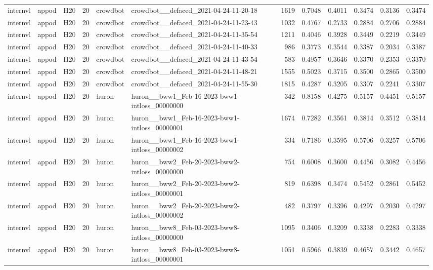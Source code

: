 \begin{table}[tbp]
\begin{tabular}{lllrllrrrrrr}
internvl & appod & H20 & 20 & crowdbot & crowdbot\_\_defaced\_2021-04-24-11-20-18 & 1619 & 0.7048 & 0.4011 & 0.3474 & 0.3136 & 0.3474 \\
internvl & appod & H20 & 20 & crowdbot & crowdbot\_\_defaced\_2021-04-24-11-23-43 & 1032 & 0.4767 & 0.2733 & 0.2884 & 0.2706 & 0.2884 \\
internvl & appod & H20 & 20 & crowdbot & crowdbot\_\_defaced\_2021-04-24-11-35-54 & 1211 & 0.4046 & 0.3928 & 0.3449 & 0.2219 & 0.3449 \\
internvl & appod & H20 & 20 & crowdbot & crowdbot\_\_defaced\_2021-04-24-11-40-33 & 986 & 0.3773 & 0.3544 & 0.3387 & 0.2034 & 0.3387 \\
internvl & appod & H20 & 20 & crowdbot & crowdbot\_\_defaced\_2021-04-24-11-43-54 & 583 & 0.4957 & 0.3646 & 0.3370 & 0.2353 & 0.3370 \\
internvl & appod & H20 & 20 & crowdbot & crowdbot\_\_defaced\_2021-04-24-11-48-21 & 1555 & 0.5023 & 0.3715 & 0.3500 & 0.2865 & 0.3500 \\
internvl & appod & H20 & 20 & crowdbot & crowdbot\_\_defaced\_2021-04-24-11-55-30 & 1815 & 0.4287 & 0.3205 & 0.3307 & 0.2241 & 0.3307 \\
internvl & appod & H20 & 20 & huron & huron\_\_bww1\_Feb-16-2023-bww1-intloss\_00000000 & 342 & 0.8158 & 0.4275 & 0.5157 & 0.4451 & 0.5157 \\
internvl & appod & H20 & 20 & huron & huron\_\_bww1\_Feb-16-2023-bww1-intloss\_00000001 & 1674 & 0.7282 & 0.3561 & 0.3814 & 0.3512 & 0.3814 \\
internvl & appod & H20 & 20 & huron & huron\_\_bww1\_Feb-16-2023-bww1-intloss\_00000002 & 334 & 0.7186 & 0.3595 & 0.5706 & 0.3257 & 0.5706 \\
internvl & appod & H20 & 20 & huron & huron\_\_bww2\_Feb-20-2023-bww2-intloss\_00000000 & 754 & 0.6008 & 0.3600 & 0.4456 & 0.3082 & 0.4456 \\
internvl & appod & H20 & 20 & huron & huron\_\_bww2\_Feb-20-2023-bww2-intloss\_00000001 & 819 & 0.6398 & 0.3474 & 0.5452 & 0.2861 & 0.5452 \\
internvl & appod & H20 & 20 & huron & huron\_\_bww2\_Feb-20-2023-bww2-intloss\_00000002 & 482 & 0.3797 & 0.3396 & 0.4297 & 0.2030 & 0.4297 \\
internvl & appod & H20 & 20 & huron & huron\_\_bww8\_Feb-03-2023-bww8-intloss\_00000000 & 1095 & 0.3406 & 0.3209 & 0.3338 & 0.2283 & 0.3338 \\
internvl & appod & H20 & 20 & huron & huron\_\_bww8\_Feb-03-2023-bww8-intloss\_00000001 & 1051 & 0.5966 & 0.3839 & 0.4657 & 0.3442 & 0.4657 \\

\end{tabular}
\end{table}
